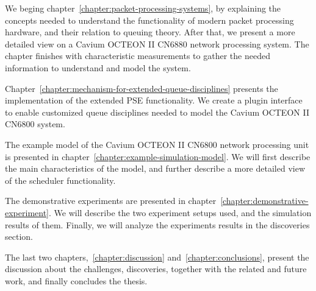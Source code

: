 We beging chapter~\ref{chapter:packet-processing-systems}, by explaining the concepts needed to understand the functionality of modern packet processing hardware, and their relation to queuing theory. After that, we present a more detailed view on a Cavium OCTEON II CN6880 network processing system. The chapter finishes with characteristic measurements to gather the needed information to understand and model the system.

Chapter~\ref{chapter:mechanism-for-extended-queue-disciplines} presents the implementation of the extended PSE functionality. We create a plugin interface to enable customized queue disciplines needed to model the Cavium OCTEON II CN6800 system.

The example model of the Cavium OCTEON II CN6800 network processing unit is presented in chapter~\ref{chapter:example-simulation-model}. We will first describe the main characteristics of the model, and further describe a more detailed view of the scheduler functionality.

The demonstrative experiments are presented in chapter~\ref{chapter:demonstrative-experiment}. We will describe the two experiment setups used, and the simulation results of them. Finally, we will analyze the experiments results in the discoveries section.

The last two chapters,~\ref{chapter:discussion} and~\ref{chapter:conclusions}, present the discussion about the challenges, discoveries, together with the related and future work, and finally concludes the thesis.


